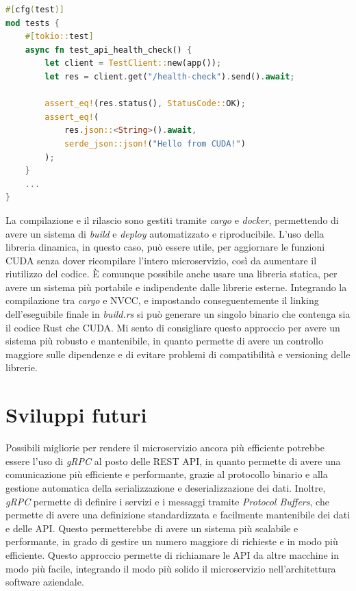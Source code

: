 \vspace{5mm}
\begin{lstlisting}[language=rust, caption=Health check test, label=lis:health_check]
#[cfg(test)]
mod tests {
    #[tokio::test]
    async fn test_api_health_check() {
        let client = TestClient::new(app());
        let res = client.get("/health-check").send().await;

        assert_eq!(res.status(), StatusCode::OK);
        assert_eq!(
            res.json::<String>().await,
            serde_json::json!("Hello from CUDA!")
        );
    }
    ...
}
\end{lstlisting}
\vspace{5mm}

La compilazione e il rilascio sono gestiti tramite \textit{cargo} e \textit{docker}, permettendo di avere un sistema di \textit{build} e \textit{deploy} automatizzato e riproducibile. L'uso della libreria dinamica, in questo caso, può essere utile, per aggiornare le funzioni \gls{CUDA} senza dover ricompilare l'intero microservizio, così da aumentare il riutilizzo del codice. È comunque possibile anche usare una libreria statica, per avere un sistema più portabile e indipendente dalle librerie esterne. Integrando la compilazione tra \textit{cargo} e \gls{NVCC}, e impostando conseguentemente il linking dell'eseguibile finale in \textit{build.rs} si può generare un singolo binario che contenga sia il codice Rust che \gls{CUDA}. Mi sento di consigliare questo approccio per avere un sistema più robusto e mantenibile, in quanto permette di avere un controllo maggiore sulle dipendenze e di evitare problemi di compatibilità e versioning delle librerie.

\section{Sviluppi futuri}


Possibili migliorie per rendere il microservizio ancora più efficiente potrebbe essere l'uso di \textit{gRPC} al posto delle REST \gls{API}, in quanto permette di avere una comunicazione più efficiente e performante, grazie al protocollo binario e alla gestione automatica della serializzazione e deserializzazione dei dati. Inoltre, \textit{gRPC} permette di definire i servizi e i messaggi tramite \textit{Protocol Buffers}, che permette di avere una definizione standardizzata e facilmente mantenibile dei dati e delle \gls{API}. Questo permetterebbe di avere un sistema più scalabile e performante, in grado di gestire un numero maggiore di richieste e in modo più efficiente. Questo approccio permette di richiamare le \gls{API} da altre macchine in modo più facile, integrando il modo più solido il microservizio nell'architettura software aziendale.

